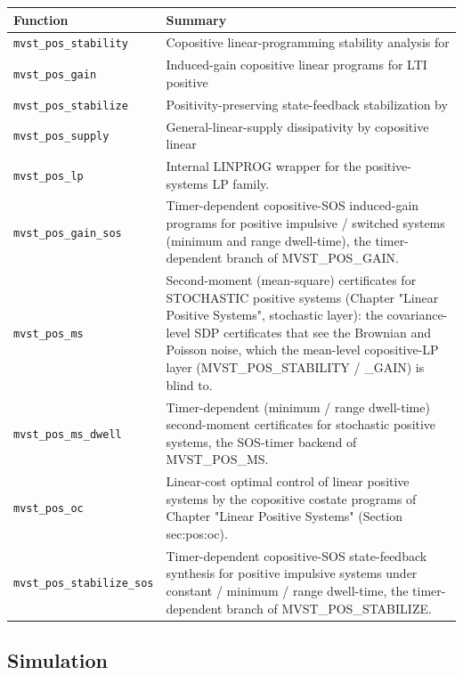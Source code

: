 \documentclass[11pt,oneside]{report}
\newcommand{\code}[1]{\texttt{#1}}
\providecommand{\real}[1]{#1}
\begin{document}
\begin{longtable}[]{@{}
  >{\raggedright\arraybackslash}p{(\columnwidth - 2\tabcolsep) * \real{0.50}}
  >{\raggedright\arraybackslash}p{(\columnwidth - 2\tabcolsep) * \real{0.50}}@{}}
\toprule
Function & Summary \\
\midrule
\endhead
\code{mvst\_pos\_stability} & Copositive linear-programming stability analysis for \\
\code{mvst\_pos\_gain} & Induced-gain copositive linear programs for LTI positive \\
\code{mvst\_pos\_stabilize} & Positivity-preserving state-feedback stabilization by \\
\code{mvst\_pos\_supply} & General-linear-supply dissipativity by copositive linear \\
\code{mvst\_pos\_lp} & Internal LINPROG wrapper for the positive-systems LP family. \\
\code{mvst\_pos\_gain\_sos} & Timer-dependent copositive-SOS induced-gain programs for positive impulsive / switched systems (minimum and range dwell-time), the timer-dependent branch of MVST\_POS\_GAIN. \\
\code{mvst\_pos\_ms} & Second-moment (mean-square) certificates for STOCHASTIC positive systems (Chapter "Linear Positive Systems", stochastic layer): the covariance-level SDP certificates that see the Brownian and Poisson noise, which the mean-level copositive-LP layer (MVST\_POS\_STABILITY / \_GAIN) is blind to. \\
\code{mvst\_pos\_ms\_dwell} & Timer-dependent (minimum / range dwell-time) second-moment certificates for stochastic positive systems, the SOS-timer backend of MVST\_POS\_MS. \\
\code{mvst\_pos\_oc} & Linear-cost optimal control of linear positive systems by the copositive costate programs of Chapter "Linear Positive Systems" (Section sec:pos:oc). \\
\code{mvst\_pos\_stabilize\_sos} & Timer-dependent copositive-SOS state-feedback synthesis for positive impulsive systems under constant / minimum / range dwell-time, the timer-dependent branch of MVST\_POS\_STABILIZE. \\
\bottomrule
\end{longtable}

\hypertarget{simulation}{%
\subsection{Simulation}\label{simulation}}
\end{document}
